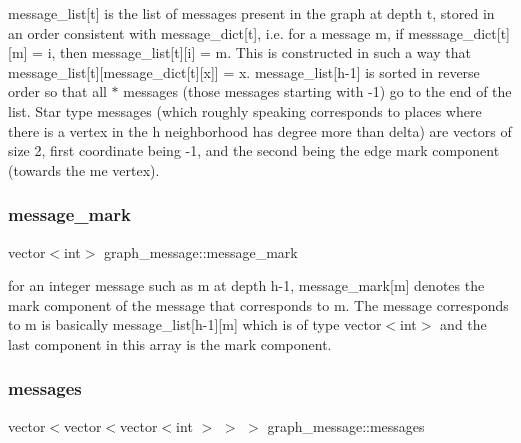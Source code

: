 message\+\_\+list\mbox{[}t\mbox{]} is the list of messages present in the graph at depth t, stored in an order consistent with message\+\_\+dict\mbox{[}t\mbox{]}, i.\+e. for a message m, if messsage\+\_\+dict\mbox{[}t\mbox{]}\mbox{[}m\mbox{]} = i, then message\+\_\+list\mbox{[}t\mbox{]}\mbox{[}i\mbox{]} = m. This is constructed in such a way that message\+\_\+list\mbox{[}t\mbox{]}\mbox{[}message\+\_\+dict\mbox{[}t\mbox{]}\mbox{[}x\mbox{]}\mbox{]} = x. message\+\_\+list\mbox{[}h-\/1\mbox{]} is sorted in reverse order so that all $\ast$ messages (those messages starting with -\/1) go to the end of the list. Star type messages (which roughly speaking corresponds to places where there is a vertex in the h neighborhood has degree more than delta) are vectors of size 2, first coordinate being -\/1, and the second being the edge mark component (towards the \textquotesingle{}me\textquotesingle{} vertex). 

\mbox{\label{classgraph__message_a49d9af5150daf0599c29fe18cb032fa5}} 
\subsubsection{\texorpdfstring{message\+\_\+mark}{message\_mark}}
{\footnotesize\ttfamily vector$<$int$>$ graph\+\_\+message\+::message\+\_\+mark}



for an integer message such as m at depth h-\/1, message\+\_\+mark\mbox{[}m\mbox{]} denotes the mark component of the message that corresponds to m. The message corresponds to m is basically message\+\_\+list\mbox{[}h-\/1\mbox{]}\mbox{[}m\mbox{]} which is of type vector$<$int$>$ and the last component in this array is the mark component. 

\mbox{\label{classgraph__message_aac77e098f0acf9650116a8e51fe3b4b7}} 
\subsubsection{\texorpdfstring{messages}{messages}}
{\footnotesize\ttfamily vector$<$vector$<$vector$<$int $>$ $>$ $>$ graph\+\_\+message\+::messages}



